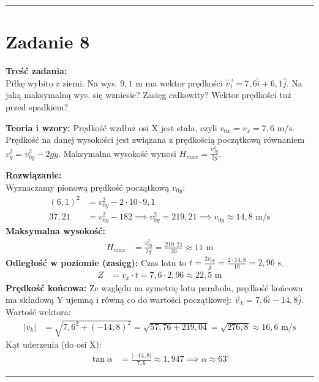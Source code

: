 \documentclass[11pt, a4paper]{article}
\begin{document}
\vspace{0.5cm}
\hrule
\vspace{0.5cm}

\section*{Zadanie 8}

\textbf{Treść zadania:} \\
Piłkę wybito z ziemi. Na wys. $9,1 \text{ m}$ ma wektor prędkości $\vec{v_{1}}=7,6\hat{i}+6,1\hat{j}$. Na jaką maksymalną wys. się wzniesie? Zasięg całkowity? Wektor prędkości tuż przed spadkiem?

\textbf{Teoria i wzory:}
Prędkość wzdłuż osi X jest stała, czyli $v_{0x} = v_x = 7,6 \text{ m/s}$. Prędkość na danej wysokości jest związana z prędkością początkową równaniem $v_y^2 = v_{0y}^2 - 2gy$. Maksymalna wysokość wynosi $H_{max} = \frac{v_{0y}^2}{2g}$.

\textbf{Rozwiązanie:} \\
Wyznaczamy pionową prędkość początkową $v_{0y}$:
\begin{align*}
    (6,1)^2 &= v_{0y}^2 - 2 \cdot 10 \cdot 9,1 \\
    37,21 &= v_{0y}^2 - 182 \implies v_{0y}^2 = 219,21 \implies v_{0y} \approx 14,8 \text{ m/s}
\end{align*}
\textbf{Maksymalna wysokość:}
\begin{align*}
    H_{max} &= \frac{v_{0y}^2}{2g} = \frac{219,21}{20} \approx 11 \text{ m}
\end{align*}
\textbf{Odległość w poziomie (zasięg):} Czas lotu to $t = \frac{2v_{0y}}{g} = \frac{2 \cdot 14,8}{10} = 2,96 \text{ s}$.
\begin{align*}
    Z &= v_x \cdot t = 7,6 \cdot 2,96 \approx 22,5 \text{ m}
\end{align*}
\textbf{Prędkość końcowa:} Ze względu na symetrię lotu parabola, prędkość końcowa ma składową Y ujemną i równą co do wartości początkowej: $\vec{v}_k = 7,6\hat{i} - 14,8\hat{j}$.
Wartość wektora:
\begin{align*}
    |v_k| &= \sqrt{7,6^2 + (-14,8)^2} = \sqrt{57,76 + 219,04} = \sqrt{276,8} \approx 16,6 \text{ m/s}
\end{align*}
Kąt uderzenia (do osi X):
\begin{align*}
    \tan\alpha &= \frac{|-14,8|}{7,6} \approx 1,947 \implies \alpha \approx 63^\circ
\end{align*}

\vspace{0.5cm}
\hrule
\vspace{0.5cm}
\end{document}
